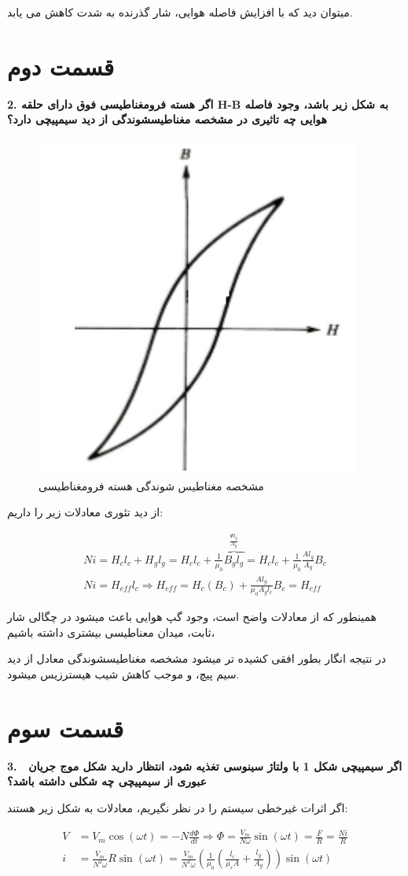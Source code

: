 \documentclass[11pt]{article}
\begin{document}
میتوان دید که با افزایش فاصله هوایی، شار گذرنده به شدت کاهش می یابد.

\clearpage

\section{قسمت دوم}

\textbf{
	2.
	اگر هسته فرومغناطیسی فوق دارای حلقه H-B به شکل زیر باشد، وجود فاصله هوایی چه تاثیری در مشخصه
	مغناطیسشوندگی از دید سیمپیچی دارد؟
}

\begin{figure}[h]
	\centering
	\includegraphics*[width=0.2\linewidth]{result/2.png}
	\caption{ مشخصه مغناطیس شوندگی هسته فرومغناطیسی}
\end{figure}

از دید تئوری معادلات زیر را داریم:

\vspace*{-1em}
\begin{gather*}
	Ni = H_cl_c+H_gl_g = H_c l_c + \frac{1}{\mu_0}\overbrace{B_g l_g}^{\frac{\Phi l_g}{A_g}} = 
	H_c l_c + \frac{1}{\mu_0}\frac{Al_g}{A_g}B_c\\
	Ni = H_{eff}l_c\Rightarrow H_{eff} = H_c(B_c) + \frac{Al_g}{\mu_0A_gl_c}B_c = H_{eff}
\end{gather*}

همینطور که از معادلات واضح است، وجود گپ هوایی باعث میشود در چگالی شار ثابت، میدان معناطیسی بیشتری داشته باشیم، 

در نتیجه انگار بطور افقی کشیده تر میشود مشخصه مغناطیسشوندگی معادل از دید سیم پیچ، و موجب کاهش 
شیب هیسترزیس میشود.

\section{قسمت سوم}

\textbf{
	3.
	 اگر سیمپیچی شکل 1 با ولتاژ سینوسی تغذیه شود، انتظار دارید شکل موج جریان عبوری از سیمپیچی چه
	شکلی داشته باشد؟
}

اگر اثرات غیرخطی سیستم را در نظر نگیریم، معادلات به شکل زیر هستند: 

\vspace*{-1em}
\begin{align*}
	V&=V_m\cos(\omega t)=-N\frac{d\Phi}{dt}\Rightarrow \Phi = \frac{V_m}{N\omega}\sin(\omega t)=\frac{F}{R}=\frac{Ni}{R}\\
	i&=\frac{V_m}{N^2\omega}R\sin(\omega t)=\frac{V_m}{N^2\omega}\left(\frac{1}{\mu_0}(\frac{l_c}{\mu_r A}+\frac{l_g}{A_g})\right)\sin(\omega t)
\end{align*}
\end{document}
